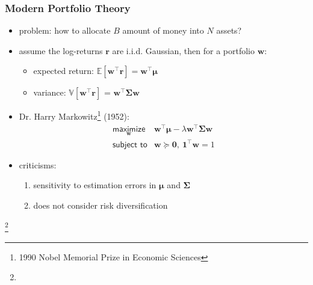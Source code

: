 \documentclass[aspectratio=169]{beamer}
\newcommand\blfootnote[1]{%
  \begingroup
  \renewcommand\thefootnote{}\footnote{#1}%
  \addtocounter{footnote}{-1}%
  \endgroup
}
\begin{document}
		\begin{frame}
			\frametitle{Modern Portfolio Theory}
                        \vspace{1cm}
                        \begin{itemize}
                          \item problem: how to allocate $B$ amount of money into $N$ assets?
                            \pause
                          \item assume the log-returns $\bm{r}$ are i.i.d. Gaussian, then for a portfolio $\bm{w}$:
                            \begin{itemize}
                              \item expected return: $\mathbb{E}\left[\bm{w}^\top \bm{r}\right] = \bm{w}^\top\boldsymbol{\mu}$
                              \item variance: $\mathbb{V}\left[\bm{w}^\top \bm{r}\right]$ = $\bm{w}^\top\boldsymbol{\Sigma}\bm{w}$
                            \end{itemize}
                            \pause
                          \item Dr. Harry Markowitz\footnote{1990 Nobel Memorial Prize in Economic Sciences} (1952):
                                  \begin{equation*}
                                  \begin{array}{ll}
                                    \underset{\bm{w}}{\textsf{maximize}} & \bm{w}^\top\boldsymbol{\mu} - \lambda\bm{w}^\top\boldsymbol{\Sigma}\bm{w}\\
                                    \textsf{subject to} & \bm{w}\succeq \mathbf{0}, ~\mathbf{1}^\top\bm{w} = 1
                                  \end{array}
                                  \end{equation*}
                            \pause
                           \item criticisms:
                             \begin{enumerate}
                               \item sensitivity to estimation errors in $\boldsymbol{\mu}$ and $\boldsymbol{\Sigma}$
                               \item does not consider risk diversification
                               \end{enumerate}
                        \end{itemize}
                        \blfootnote{  }
		\end{frame}
\end{document}
